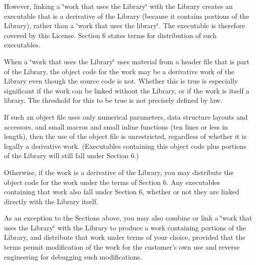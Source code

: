 However, linking a \char`\"{}work that uses the Library\char`\"{} with the Library creates an executable that is a derivative of the Library (because it contains portions of the Library), rather than a \char`\"{}work that uses the
library\char`\"{}. The executable is therefore covered by this License. Section 6 states terms for distribution of such executables.

When a \char`\"{}work that uses the Library\char`\"{} uses material from a header file that is part of the Library, the object code for the work may be a derivative work of the Library even though the source code is not. Whether this is true is especially significant if the work can be linked without the Library, or if the work is itself a library. The threshold for this to be true is not precisely defined by law.

If such an object file uses only numerical parameters, data structure layouts and accessors, and small macros and small inline functions (ten lines or less in length), then the use of the object file is unrestricted, regardless of whether it is legally a derivative work. (Executables containing this object code plus portions of the Library will still fall under Section 6.)

Otherwise, if the work is a derivative of the Library, you may distribute the object code for the work under the terms of Section 6. Any executables containing that work also fall under Section 6, whether or not they are linked directly with the Library itself.
\begin{DoxyEnumerate}
\item As an exception to the Sections above, you may also combine or link a \char`\"{}work that uses the Library\char`\"{} with the Library to produce a work containing portions of the Library, and distribute that work under terms of your choice, provided that the terms permit modification of the work for the customer's own use and reverse engineering for debugging such modifications.
\end{DoxyEnumerate}

